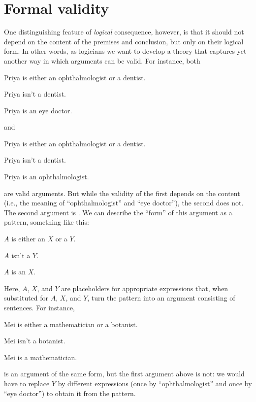 \section{Formal validity}\label{s:FormalValidity}

One distinguishing feature of \emph{logical} consequence, however, is
that it should not depend on the content of the premises and
conclusion, but only on their logical form. In other words, as
logicians we want to develop a theory that captures yet another way in
which arguments can be valid. For instance,
both
\begin{earg}
	\item[] Priya is either an ophthalmologist or a dentist.
	\item[] Priya isn't a dentist.
	\item[\texttherefore] Priya is an eye doctor.
\end{earg}
and
\begin{earg}
	\item[] Priya is either an ophthalmologist or a dentist.
	\item[] Priya isn't a dentist.
	\item[\texttherefore] Priya is an ophthalmologist.
\end{earg}
are valid arguments. But while the validity of the first depends on the content (i.e., the meaning of ``ophthalmologist'' and ``eye doctor''), the second does not. The second argument is . We can describe the ``form'' of this argument as a pattern, something like this:
\begin{earg}
	\item[] $A$ is either an $X$ or a $Y$.
	\item[] $A$ isn't a $Y$.
	\item[\texttherefore] $A$ is an $X$.
\end{earg}
Here, $A$, $X$, and $Y$ are placeholders for appropriate expressions that, when substituted for $A$, $X$, and $Y$, turn the pattern into an argument consisting of sentences. For instance,
\begin{earg}
	\item[] Mei is either a mathematician or a botanist.
	\item[] Mei isn't a botanist.
	\item[\texttherefore] Mei is a mathematician.
\end{earg}
is an argument of the same form, but the first argument above is not: we would have to replace $Y$ by different expressions (once by ``ophthalmologist'' and once by ``eye doctor'') to obtain it from the pattern.

